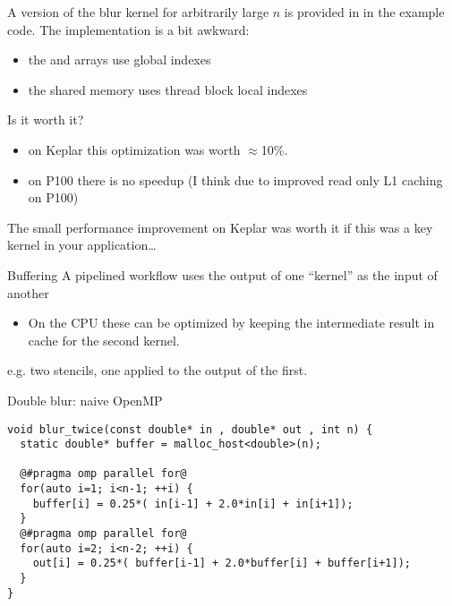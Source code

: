 \documentclass[aspectratio=43]{beamer}
\begin{document}
\begin{frame}[fragile]{}
        A version of the blur kernel for arbitrarily large $n$ is provided in  in the example code. The implementation is a bit awkward:
        \begin{itemize}
            \item  the  and  arrays use global indexes
            \item  the shared memory uses thread block local indexes
        \end{itemize}

    \begin{info}{Is it worth it?}
        \begin{itemize}
            \item on Keplar this optimization was worth $\approx$10\%.
            \item on P100 there is no speedup (I think due to improved read only L1 caching on P100)
        \end{itemize}
        The small performance improvement on Keplar was worth it if this was a key kernel in your application\dots
    \end{info}

\end{frame}

\begin{frame}[fragile]{}
    \begin{info}{Buffering}
        A pipelined workflow uses the output of one ``kernel'' as the input of another
        \begin{itemize}
            \item On the CPU these can be optimized by keeping the intermediate result in cache for the second kernel.
        \end{itemize}
        e.g. two stencils, one applied to the output of the first.
    \end{info}

    \begin{code}{Double blur: naive OpenMP}
        \begin{lstlisting}[style=boxcudatiny]
void blur_twice(const double* in , double* out , int n) {
  static double* buffer = malloc_host<double>(n);

  @#pragma omp parallel for@
  for(auto i=1; i<n-1; ++i) {
    buffer[i] = 0.25*( in[i-1] + 2.0*in[i] + in[i+1]);
  }
  @#pragma omp parallel for@
  for(auto i=2; i<n-2; ++i) {
    out[i] = 0.25*( buffer[i-1] + 2.0*buffer[i] + buffer[i+1]);
  }
}
        \end{lstlisting}
    \end{code}

\end{frame}
\end{document}
